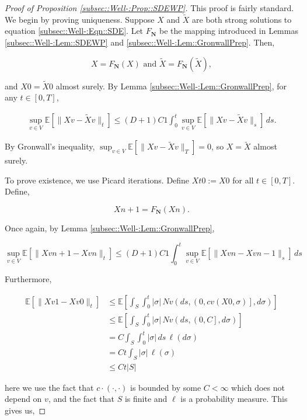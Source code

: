 \documentclass[12pt]{article}
\newcommand{\skipLine}{\vspace{12pt}}
\newcommand{\mb}{\mathbb}
\newcommand{\te}{\text}
\newcommand{\ex}[1]{\mb{E}\left[#1\right]}			%
\newcommand{\defeq}{:=}								%
\renewcommand{\v}{v}							%
\renewcommand{\S}{S}							%
\newcommand{\s}{\sigma}							%
\newcommand{\T}{T}								%
\renewcommand{\t}{t}							%
\renewcommand{\tt}{s}							%
\newcommand{\X}{X}								%
\newcommand{\IGr}{c}							%
\newcommand{\const}{C}							%
\newcommand{\degr}{D}							%
\newcommand{\poisses}{\mathbf{N}}				%
\newcommand{\poiss}{N}							%
\newcommand{\Sm}{\ell}							%
\newcommand{\Fpo}{F_{\poisses}}					%
\newcommand{\alt}[1]{\widetilde{#1}}			%
\begin{document}
\begin{proof}[Proof of Proposition \ref{subsec::Well-:Prop::SDEWP}]

This proof is fairly standard. We begin by proving uniqueness. Suppose \(\X{}{}\) and \(\alt{\X}{}{}\) are both strong solutions to equation \ref{subsec::Well-:Eqn::SDE}. Let \(\Fpo\) be the mapping introduced in Lemmas \ref{subsec::Well-:Lem::SDEWP} and \ref{subsec::Well-:Lem::GronwallPrep}. Then,

\[\X{}{} = \Fpo(\X{}{})\te{ and } \alt{\X}{}{} = \Fpo(\alt{\X}{}{}),\]

and \(\X{}{0} = \alt{\X}{}{0}\) almost surely. By Lemma \ref{subsec::Well-:Lem::GronwallPrep}, for any \(\t\in [0,\T]\),

\begin{align*}
\sup_{\v\in V}\ex{\|\X{\v}{} - \alt{\X}{\v}{}\|_\t} \leq (\degr+1)\const{1}\int_0^\t\sup_{\v\in V} \ex{\|\X{\v}{} - \alt{\X}{\v}{}\|_\tt}\,d\tt.
\end{align*}

By Gronwall's inequality, \(\sup_{\v \in V} \ex{\|\X{\v}{} - \alt{\X}{\v}{}\|_\T} = 0\), so \(\X{}{} = \alt{\X}{}{}\) almost surely.

\skipLine

To prove existence, we use Picard iterations. Define \(\X{}{\t}{0} \defeq \X{}{0}\) for all \(\t \in [0,\T]\). Define,

\[\X{}{}{n+1} = \Fpo(\X{}{}{n}).\]

Once again, by Lemma \ref{subsec::Well-:Lem::GronwallPrep},

\[\sup_{\v \in V} \ex{\|\X{\v}{}{n+1} - \X{\v}{}{n}\|_\t} \leq (\degr+1)\const{1} \int_0^\t \sup_{\v \in V} \ex{\|\X{\v}{}{n} - \X{\v}{}{n-1}\|_\tt}\,d\tt\] 

Furthermore, 

\begin{align*}
\ex{\|\X{\v}{}{1} - \X{\v}{}{0}\|_\t} &\leq \ex{\int_\S\int_0^\t |\s|\,\poiss{\v}\left(d\tt,\left(0,\IGr{\v}(\X{}{0},\s)\right],d\s\right)}\\
&\leq \ex{\int_\S\int_0^\t |\s|\,\poiss{\v}\left(d\tt,\left(0,\const{}\right],d\s\right)}\\
&= \const{}\int_\S\int_0^\t |\s|\,d\tt\,\Sm(d\s)\\
&=\const{}\t\int_\S |\s|\,\Sm(\s)\\
&\leq \const{}\t|\S|
\end{align*}

here we use the fact that \(\IGr{\cdot}(\cdot,\cdot)\) is bounded by some \(\const{} < \infty\) which does not depend on \(\v\), and the fact that \(\S\) is finite and \(\Sm\) is a probability measure. This gives us,


\end{proof}
\end{document}
